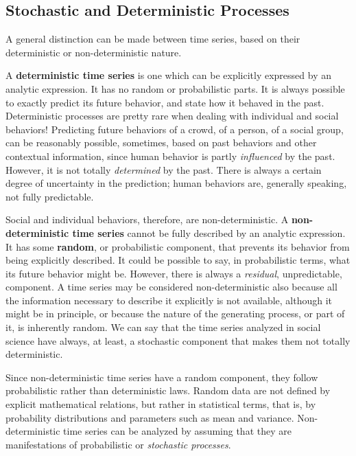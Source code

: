 \documentclass[
]{article}
\begin{document}
\subsection{Stochastic and Deterministic Processes}\label{stochastic-and-deterministic-processes}

A general distinction can be made between time series, based on their deterministic or non-deterministic nature.

A \textbf{deterministic time series} is one which can be explicitly expressed by an analytic expression. It has no random or probabilistic parts. It is always possible to exactly predict its future behavior, and state how it behaved in the past. Deterministic processes are pretty rare when dealing with individual and social behaviors! Predicting future behaviors of a crowd, of a person, of a social group, can be reasonably possible, sometimes, based on past behaviors and other contextual information, since human behavior is partly \emph{influenced} by the past. However, it is not totally \emph{determined} by the past. There is always a certain degree of uncertainty in the prediction; human behaviors are, generally speaking, not fully predictable.

Social and individual behaviors, therefore, are non-deterministic. A \textbf{non-deterministic time series} cannot be fully described by an analytic expression. It has some \textbf{random}, or probabilistic component, that prevents its behavior from being explicitly described. It could be possible to say, in probabilistic terms, what its future behavior might be. However, there is always a \emph{residual}, unpredictable, component. A time series may be considered non-deterministic also because all the information necessary to describe it explicitly is not available, although it might be in principle, or because the nature of the generating process, or part of it, is inherently random. We can say that the time series analyzed in social science have always, at least, a stochastic component that makes them not totally deterministic.

Since non-deterministic time series have a random component, they follow probabilistic rather than deterministic laws. Random data are not defined by explicit mathematical relations, but rather in statistical terms, that is, by probability distributions and parameters such as mean and variance. Non-deterministic time series can be analyzed by assuming that they are manifestations of probabilistic or \emph{stochastic processes}.
\end{document}
